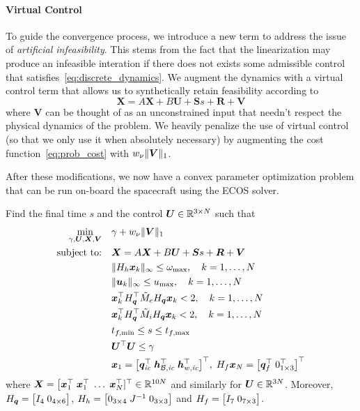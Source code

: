 \documentclass[10pt]{article}
\begin{document}
\paragraph{Virtual Control}

To guide the convergence process, we introduce a new term to address the issue of \textit{artificial infeasibility}. This stems from the fact that the linearization may produce an infeasible interation if there does not exists some admissible control that satisfies~\eqref{eq:discrete_dynamics}. We augment the dynamics with a virtual control term that allows us to synthetically retain feasibility according to
\begin{equation}
\bm{X} = A \bm{X} + B \bm{U} + \bm{S} s + \bm{R} + \bm{V}
\label{eq:VC_discrete_dynamics}
\end{equation}
where $\bm{V}$ can be thought of as an unconstrained input that needn't respect the physical dynamics of the problem. We heavily penalize the use of virtual control (so that we only use it when absolutely necessary) by augmenting the cost function~\eqref{eq:prob_cost} with $w_{\nu} \| \bm{V} \|_1$.

After these modifications, we now have a convex parameter optimization problem that can be run on-board the spacecraft using the ECOS solver. 

\begin{problem}\label{prob:prob2}
Find the final time $s$ and the control $\bm{U}\in{\mathbb{R}}^{3 \times N}$ such that
\begin{subequations}\label{eq:prob2}
\begin{align}
\min_{\gamma,\bm{U},\bm{X},\bm{V}} &\quad \gamma + w_{\nu} \| \bm{V} \|_1 \label{eq:p2_a}\\
\text{subject to:} &\quad \bm{X} = A \bm{X} + B \bm{U} + \bm{S} s + \bm{R} + \bm{V} \label{eq:p2_b}\\
&\quad \| H_h \bm{x}_k \|_{\infty} \leq \omega_{\max}, \quad k=1,\ldots,N \label{eq:p2_c}\\ 
&\quad \| \bm{u}_k \|_{\infty} \leq u_{\max}, \quad k=1,\ldots,N \label{eq:p2_d}\\
&\quad \bm{x}_k^{\top} H_{\bm{q}}^{\top} \tilde{M}_e H_{\bm{q}} \bm{x}_k < 2, \quad k=1,\ldots,N \label{eq:p2_e}\\
&\quad \bm{x}_k^{\top} H_{\bm{q}}^{\top} \tilde{M}_i H_{\bm{q}} \bm{x}_k < 2, \quad k=1,\ldots,N \label{eq:p2_f}\\
&\quad t_{f,\min} \leq s \leq t_{f,\max} \label{eq:p2_g} \\
&\quad \bm{U}^{\top}\bm{U} \leq \gamma \label{eq:p2_cost} \\ 
&\quad \bm{x}_1 = \big[ \bm{q}_\textit{ic}^{\top} \; \bm{h}_{\mathcal{B},\textit{ic}}^{\top} \; \bm{h}_{w,\textit{ic}}^{\top} \big]^{\top}, \; H_f \bm{x}_N = \big[ \bm{q}_f^{\top} \; 0_{1 \times 3} ^{\top} \big]^{\top} \label{eq:p2_h}
\end{align}
\end{subequations}
where $\bm{X} = \big[ \bm{x}_1^{\top} \; \bm{x}_1^{\top} \; \ldots \; \bm{x}_{N}^{\top} ]^{\top} \in {\mathbb{R}}^{10N}$ and similarly for $\bm{U}\in{\mathbb{R}}^{3N}$. Moreover, $H_{\bm{q}} = \big[ I_{4} \; 0_{4 \times 6} \big]$, $H_h = \big[ 0_{3 \times 4} \; J^{-1} \; 0_{3 \times 3} \big]$ and $H_f = \big[ I_{7} \; 0_{7 \times 3} \big]$.
\end{problem}
\end{document}

